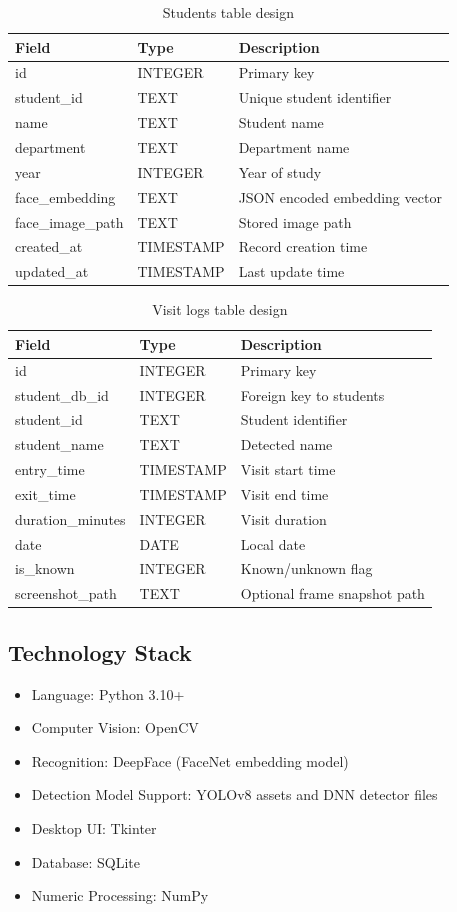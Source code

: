 \documentclass{fisatprojectfinal}
\begin{document}
\begin{table}[h!]
\centering
\caption{Students table design}
\begin{tabular}{|l|l|l|}
\hline
Field & Type & Description \\
\hline
id & INTEGER & Primary key \\
student\_id & TEXT & Unique student identifier \\
name & TEXT & Student name \\
department & TEXT & Department name \\
year & INTEGER & Year of study \\
face\_embedding & TEXT & JSON encoded embedding vector \\
face\_image\_path & TEXT & Stored image path \\
created\_at & TIMESTAMP & Record creation time \\
updated\_at & TIMESTAMP & Last update time \\
\hline
\end{tabular}
\end{table}

\begin{table}[h!]
\centering
\caption{Visit logs table design}
\begin{tabular}{|l|l|l|}
\hline
Field & Type & Description \\
\hline
id & INTEGER & Primary key \\
student\_db\_id & INTEGER & Foreign key to students \\
student\_id & TEXT & Student identifier \\
student\_name & TEXT & Detected name \\
entry\_time & TIMESTAMP & Visit start time \\
exit\_time & TIMESTAMP & Visit end time \\
duration\_minutes & INTEGER & Visit duration \\
date & DATE & Local date \\
is\_known & INTEGER & Known/unknown flag \\
screenshot\_path & TEXT & Optional frame snapshot path \\
\hline
\end{tabular}
\end{table}

\subsection {Technology Stack}
\begin{itemize}
	\item Language: Python 3.10+
	\item Computer Vision: OpenCV
	\item Recognition: DeepFace (FaceNet embedding model)
	\item Detection Model Support: YOLOv8 assets and DNN detector files
	\item Desktop UI: Tkinter
	\item Database: SQLite
	\item Numeric Processing: NumPy
\end{itemize}
\end{document}

